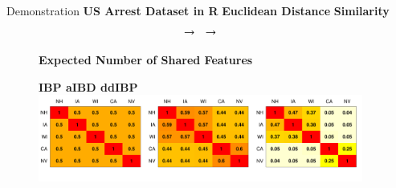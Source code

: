 \documentclass[serif,mathserif,final]{beamer}
\begin{document}
\begin{frame}{}
\begin{columns}[t]
\begin{column}{0.25\linewidth}
    \end{column}%

    \begin{column}{0.4\linewidth}

      \begin{block}{Demonstration}
        \hspace{4em}\textbf{US Arrest Dataset in R}
        \hspace{6em}\textbf{Euclidean Distance}
        \hspace{6.5em}\textbf{Similarity}
        \vspace{-.5em}
        \[
          
          \hspace{.5em}\rightarrow\hspace{.5em}
          
          \hspace{.5em}\rightarrow\hspace{.5em}
          
        \]

        \vspace{1em}
        \begin{figure}[htb]
          \centering
          \textbf{Expected Number of Shared Features}\\ \vspace{.5em}
          \raggedright{\small\textsf{\textbf{\hspace{8.5em}IBP \hspace{15.5em} aIBD \hspace{15em} ddIBP}}}\\
          \includegraphics[width=.99\columnwidth]{sharedFeatures}


\end{figure}
\end{block}
\end{column}
\end{columns}
\end{frame}
\end{document}
